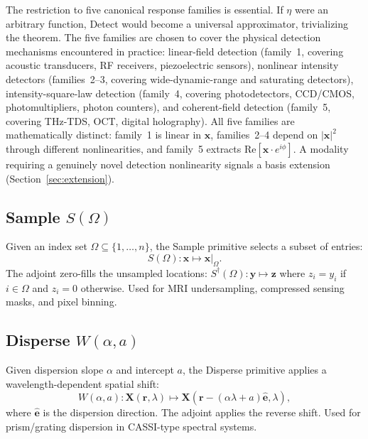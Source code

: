 \documentclass[11pt]{article}
\begin{document}
\begin{remark}
\label{rem:detect}
The restriction to five canonical response families is essential. If $\eta$ were an arbitrary function, Detect would become a universal approximator, trivializing the theorem. The five families are chosen to cover the physical detection mechanisms encountered in practice: linear-field detection (family~1, covering acoustic transducers, RF receivers, piezoelectric sensors), nonlinear intensity detectors (families~2--3, covering wide-dynamic-range and saturating detectors), intensity-square-law detection (family~4, covering photodetectors, CCD/CMOS, photomultipliers, photon counters), and coherent-field detection (family~5, covering THz-TDS, OCT, digital holography). All five families are mathematically distinct: family~1 is linear in $\mathbf{x}$, families~2--4 depend on $|\mathbf{x}|^2$ through different nonlinearities, and family~5 extracts $\mathrm{Re}[\mathbf{x} \cdot e^{i\phi}]$. A modality requiring a genuinely novel detection nonlinearity signals a basis extension (Section~\ref{sec:extension}).
\end{remark}

\subsection{Sample \texorpdfstring{$S(\Omega)$}{S(Omega)}}

\begin{definition}[Sample]
\label{def:sample}
Given an index set $\Omega \subseteq \{1, \ldots, n\}$, the Sample primitive selects a subset of entries:
\begin{equation}
  S(\Omega): \mathbf{x} \mapsto \mathbf{x}|_\Omega.
\end{equation}
The adjoint zero-fills the unsampled locations: $S^\dagger(\Omega): \mathbf{y} \mapsto \mathbf{z}$ where $z_i = y_i$ if $i \in \Omega$ and $z_i = 0$ otherwise. Used for MRI undersampling, compressed sensing masks, and pixel binning.
\end{definition}

\subsection{Disperse \texorpdfstring{$W(\alpha, a)$}{W(alpha, a)}}

\begin{definition}[Disperse]
\label{def:disperse}
Given dispersion slope $\alpha$ and intercept $a$, the Disperse primitive applies a wavelength-dependent spatial shift:
\begin{equation}
  W(\alpha, a): \mathbf{X}(\mathbf{r}, \lambda) \mapsto \mathbf{X}(\mathbf{r} - (\alpha\lambda + a)\hat{\mathbf{e}}, \lambda),
\end{equation}
where $\hat{\mathbf{e}}$ is the dispersion direction. The adjoint applies the reverse shift. Used for prism/grating dispersion in CASSI-type spectral systems.
\end{definition}
\end{document}
